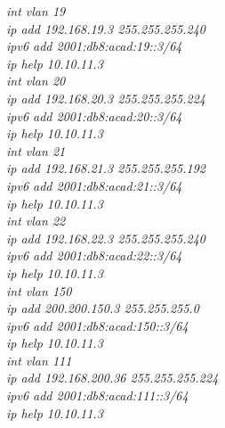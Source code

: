 \documentclass[12pt,a4paper]{report}
\begin{document}
\hspace*{2cm}\textit{int vlan 19\\
\hspace*{2cm}ip add 192.168.19.3 255.255.255.240\\
\hspace*{2cm}ipv6 add 2001:db8:acad:19::3/64\\
\hspace*{2cm}ip help 10.10.11.3\\
\hspace*{2cm}int vlan 20\\
\hspace*{2cm}ip add 192.168.20.3 255.255.255.224\\
\hspace*{2cm}ipv6 add 2001:db8:acad:20::3/64\\
\hspace*{2cm}ip help 10.10.11.3\\
\hspace*{2cm}int vlan 21\\
\hspace*{2cm}ip add 192.168.21.3 255.255.255.192\\
\hspace*{2cm}ipv6 add 2001:db8:acad:21::3/64\\
\hspace*{2cm}ip help 10.10.11.3\\
\hspace*{2cm}int vlan 22\\
\hspace*{2cm}ip add 192.168.22.3 255.255.255.240\\
\hspace*{2cm}ipv6 add 2001:db8:acad:22::3/64\\
\hspace*{2cm}ip help 10.10.11.3\\
\hspace*{2cm}int vlan 150\\
\hspace*{2cm}ip add 200.200.150.3 255.255.255.0\\
\hspace*{2cm}ipv6 add 2001:db8:acad:150::3/64\\
\hspace*{2cm}ip help 10.10.11.3\\
\hspace*{2cm}int vlan 111\\
\hspace*{2cm}ip add 192.168.200.36 255.255.255.224 \\
\hspace*{2cm}ipv6 add 2001:db8:acad:111::3/64\\
\hspace*{2cm}ip help 10.10.11.3\\}
\end{document}
